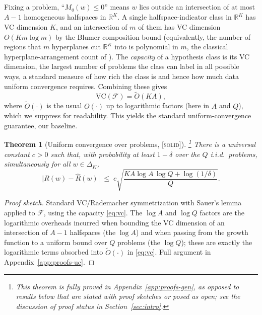 \documentclass{article} %
\newtheorem{theorem}{Theorem}
\providecommand{\R}{\mathbb{R}}
\providecommand{\simplex}{\Delta_K}
\providecommand{\Risk}{R}
\providecommand{\eRisk}{\widehat{R}}
\providecommand{\Fcal}{\mathcal{F}}
\providecommand{\VC}{\mathrm{VC}}
\providecommand{\Too}{\widetilde{O}}
\providecommand{\solid}{\textsc{[solid]}}
\providecommand{\solid}{}
\begin{document}
Fixing a problem, ``$M_q(w)\le 0$'' means $w$ lies outside an intersection of at
most $A-1$ homogeneous halfspaces in $\R^K$. A single halfspace-indicator class in
$\R^K$ has VC dimension $K$, and an intersection of $m$ of them has VC dimension
$O(Km\log m)$ by the Blumer composition bound \citep{blumer1989learnability}
(equivalently, the number of regions that $m$ hyperplanes cut $\R^K$ into is
polynomial in $m$, the classical hyperplane-arrangement count of
\citet{zaslavsky1975facing}). The \emph{capacity} of a hypothesis class is its VC
dimension, the largest number of problems the class can label in all possible
ways, a standard measure of how rich the class is and hence how much data uniform
convergence requires. Combining these gives
\begin{equation}
\label{eq:vc}
\VC(\Fcal) = \Too(KA),
\end{equation}
where $\Too(\cdot)$ is the usual $O(\cdot)$ up to logarithmic factors (here in $A$
and $Q$), which we suppress for readability. This yields the standard
uniform-convergence guarantee, our baseline.

\begin{theorem}[Uniform convergence over problems, \solid]%
\footnote{This theorem is fully proved in Appendix~\ref{app:proofs-gen}, as
opposed to results below that are stated with proof sketches or posed as open;
see the discussion of proof status in Section~\ref{sec:intro}.}
\label{thm:convergence}
There is a universal constant $c>0$ such that, with probability at least
$1-\delta$ over the $Q$ i.i.d.\ problems, simultaneously for all $w\in\simplex$,
\begin{equation}
\label{eq:thm1}
\big|\Risk(w)-\eRisk(w)\big|
\;\le\;
c\sqrt{\frac{KA\log A\,\log Q + \log(1/\delta)}{Q}}.
\end{equation}
\end{theorem}

\begin{proof}[Proof sketch]
Standard VC/Rademacher symmetrization with Sauer's lemma
\citep{sauer1972density,shelah1972combinatorial,vapnik1971uniform} applied to
$\Fcal$, using the capacity \eqref{eq:vc}. The $\log A$ and $\log Q$ factors are
the logarithmic overheads incurred when bounding the VC dimension of an
intersection of $A-1$ halfspaces (the $\log A$) and when passing from the growth
function to a uniform bound over $Q$ problems (the $\log Q$); these are exactly
the logarithmic terms absorbed into $\Too(\cdot)$ in \eqref{eq:vc}. Full argument
in Appendix~\ref{app:proofs-uc}.
\end{proof}
\end{document}
